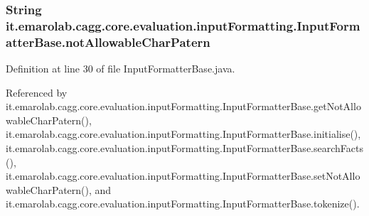 \hypertarget{classit_1_1emarolab_1_1cagg_1_1core_1_1evaluation_1_1inputFormatting_1_1InputFormatterBase_af8c1c79313632272c67711704784ef13}{
\subsubsection[{not\-Allowable\-Char\-Patern}]{\setlength{\rightskip}{0pt plus 5cm}String it.\-emarolab.\-cagg.\-core.\-evaluation.\-input\-Formatting.\-Input\-Formatter\-Base.\-not\-Allowable\-Char\-Patern\hspace{0.3cm}{\ttfamily [private]}}}\label{classit_1_1emarolab_1_1cagg_1_1core_1_1evaluation_1_1inputFormatting_1_1InputFormatterBase_af8c1c79313632272c67711704784ef13}


Definition at line 30 of file Input\-Formatter\-Base.\-java.



Referenced by it.\-emarolab.\-cagg.\-core.\-evaluation.\-input\-Formatting.\-Input\-Formatter\-Base.\-get\-Not\-Allowable\-Char\-Patern(), it.\-emarolab.\-cagg.\-core.\-evaluation.\-input\-Formatting.\-Input\-Formatter\-Base.\-initialise(), it.\-emarolab.\-cagg.\-core.\-evaluation.\-input\-Formatting.\-Input\-Formatter\-Base.\-search\-Facts(), it.\-emarolab.\-cagg.\-core.\-evaluation.\-input\-Formatting.\-Input\-Formatter\-Base.\-set\-Not\-Allowable\-Char\-Patern(), and it.\-emarolab.\-cagg.\-core.\-evaluation.\-input\-Formatting.\-Input\-Formatter\-Base.\-tokenize().

